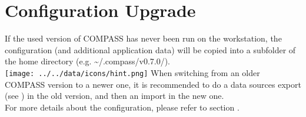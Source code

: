 
\section{Configuration Upgrade}

If the used version of COMPASS has never been run on the workstation, the configuration (and additional application data) will be copied into a subfolder of the home directory (e.g. \textasciitilde/.compass/v0.7.0/). \\

\texttt{[image: ../../data/icons/hint.png]} When switching from an older COMPASS version to a newer one, it is recommended to do a data sources export (see ) in the old version, and then an import in the new one. \\

For more details about the configuration, please refer to section .
